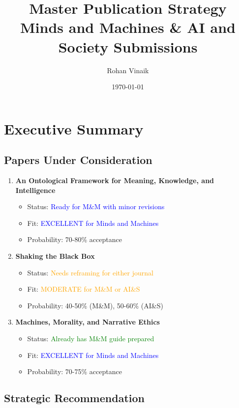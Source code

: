 \documentclass[12pt]{article}
\title{\textbf{Master Publication Strategy}\\
\large Minds and Machines \& AI and Society Submissions}
\author{Rohan Vinaik}
\date{\today}
\begin{document}
\maketitle

\tableofcontents
\newpage

\section{Executive Summary}

\subsection{Papers Under Consideration}

\begin{enumerate}
\item \textbf{An Ontological Framework for Meaning, Knowledge, and Intelligence}
   \begin{itemize}
   \item Status: \textcolor{blue}{Ready for M\&M with minor revisions}
   \item Fit: \textcolor{blue}{EXCELLENT for Minds and Machines}
   \item Probability: 70-80\% acceptance
   \end{itemize}

\item \textbf{Shaking the Black Box}
   \begin{itemize}
   \item Status: \textcolor{orange}{Needs reframing for either journal}
   \item Fit: \textcolor{orange}{MODERATE for M\&M or AI\&S}
   \item Probability: 40-50\% (M\&M), 50-60\% (AI\&S)
   \end{itemize}

\item \textbf{Machines, Morality, and Narrative Ethics}
   \begin{itemize}
   \item Status: \textcolor{green}{Already has M\&M guide prepared}
   \item Fit: \textcolor{blue}{EXCELLENT for Minds and Machines}
   \item Probability: 70-75\% acceptance
   \end{itemize}
\end{enumerate}

\subsection{Strategic Recommendation}
\end{document}
